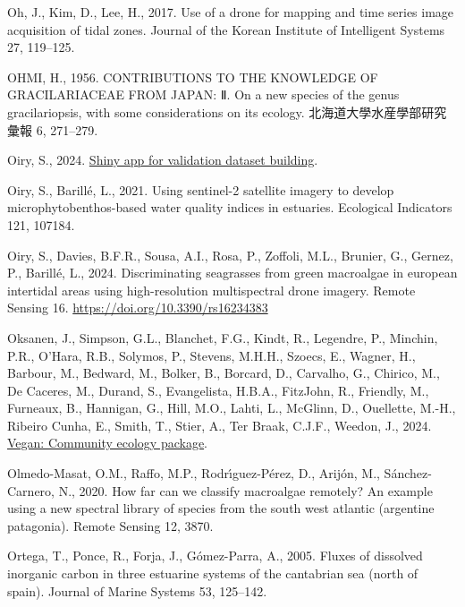 \documentclass[
  letterpaper,
  11pt,
  english,
  singlespacing,
  headsepline]{MastersDoctoralThesis}
\newlength{\cslhangindent}
\newenvironment{CSLReferences}[2] %
 {\begin{list}{}{%
  \setlength{\itemindent}{0pt}
  \setlength{\leftmargin}{0pt}
  \setlength{\parsep}{0pt}
  \ifodd #1
   \setlength{\leftmargin}{\cslhangindent}
   \setlength{\itemindent}{-1\cslhangindent}
  \fi
  \setlength{\itemsep}{#2\baselineskip}}}
 {\end{list}}
\begin{document}
\begin{CSLReferences}{1}{0}
Oh, J., Kim, D., Lee, H., 2017. Use of a drone for mapping and time
series image acquisition of tidal zones. Journal of the Korean Institute
of Intelligent Systems 27, 119--125.

OHMI, H., 1956. CONTRIBUTIONS TO THE KNOWLEDGE OF GRACILARIACEAE FROM
JAPAN: Ⅱ. On a new species of the genus gracilariopsis, with some
considerations on its ecology. 北海道大學水産學部研究彙報 6, 271--279.

Oiry, S., 2024.
\href{https://oirysimon.shinyapps.io/shiny_validate/}{Shiny app for
validation dataset building}.

Oiry, S., Barillé, L., 2021. Using sentinel-2 satellite imagery to
develop microphytobenthos-based water quality indices in estuaries.
Ecological Indicators 121, 107184.

Oiry, S., Davies, B.F.R., Sousa, A.I., Rosa, P., Zoffoli, M.L., Brunier,
G., Gernez, P., Barillé, L., 2024. Discriminating seagrasses from green
macroalgae in european intertidal areas using high-resolution
multispectral drone imagery. Remote Sensing 16.
\url{https://doi.org/10.3390/rs16234383}

Oksanen, J., Simpson, G.L., Blanchet, F.G., Kindt, R., Legendre, P.,
Minchin, P.R., O'Hara, R.B., Solymos, P., Stevens, M.H.H., Szoecs, E.,
Wagner, H., Barbour, M., Bedward, M., Bolker, B., Borcard, D., Carvalho,
G., Chirico, M., De Caceres, M., Durand, S., Evangelista, H.B.A.,
FitzJohn, R., Friendly, M., Furneaux, B., Hannigan, G., Hill, M.O.,
Lahti, L., McGlinn, D., Ouellette, M.-H., Ribeiro Cunha, E., Smith, T.,
Stier, A., Ter Braak, C.J.F., Weedon, J., 2024.
\href{https://CRAN.R-project.org/package=vegan}{Vegan: Community ecology
package}.

Olmedo-Masat, O.M., Raffo, M.P., Rodrı́guez-Pérez, D., Arijón, M.,
Sánchez-Carnero, N., 2020. How far can we classify macroalgae remotely?
An example using a new spectral library of species from the south west
atlantic (argentine patagonia). Remote Sensing 12, 3870.

Ortega, T., Ponce, R., Forja, J., Gómez-Parra, A., 2005. Fluxes of
dissolved inorganic carbon in three estuarine systems of the cantabrian
sea (north of spain). Journal of Marine Systems 53, 125--142.


\end{CSLReferences}
\end{document}
